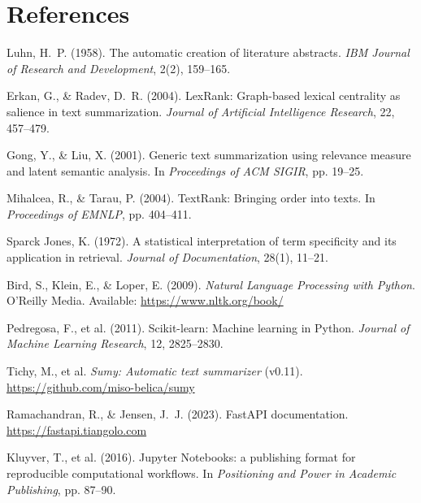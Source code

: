 \documentclass[12pt,a4paper]{article}
\begin{document}
\section*{References}

\begin{enumerate}[label={[\arabic*]}, noitemsep]

  \item Luhn, H.~P. (1958). The automatic creation of literature abstracts. \textit{IBM Journal of Research and Development}, 2(2), 159--165.

  \item Erkan, G., \& Radev, D.~R. (2004). LexRank: Graph-based lexical centrality as salience in text summarization. \textit{Journal of Artificial Intelligence Research}, 22, 457--479.

  \item Gong, Y., \& Liu, X. (2001). Generic text summarization using relevance measure and latent semantic analysis. In \textit{Proceedings of ACM SIGIR}, pp. 19--25.

  \item Mihalcea, R., \& Tarau, P. (2004). TextRank: Bringing order into texts. In \textit{Proceedings of EMNLP}, pp. 404--411.

  \item Sparck Jones, K. (1972). A statistical interpretation of term specificity and its application in retrieval. \textit{Journal of Documentation}, 28(1), 11--21.

  \item Bird, S., Klein, E., \& Loper, E. (2009). \textit{Natural Language Processing with Python}. O'Reilly Media. Available: \url{https://www.nltk.org/book/}

  \item Pedregosa, F., et al. (2011). Scikit-learn: Machine learning in Python. \textit{Journal of Machine Learning Research}, 12, 2825--2830.

  \item Tichy, M., et al. \textit{Sumy: Automatic text summarizer} (v0.11). \url{https://github.com/miso-belica/sumy}

  \item Ramachandran, R., \& Jensen, J.~J. (2023). FastAPI documentation. \url{https://fastapi.tiangolo.com}

  \item Kluyver, T., et al. (2016). Jupyter Notebooks: a publishing format for reproducible computational workflows. In \textit{Positioning and Power in Academic Publishing}, pp. 87--90.

\end{enumerate}
\end{document}
